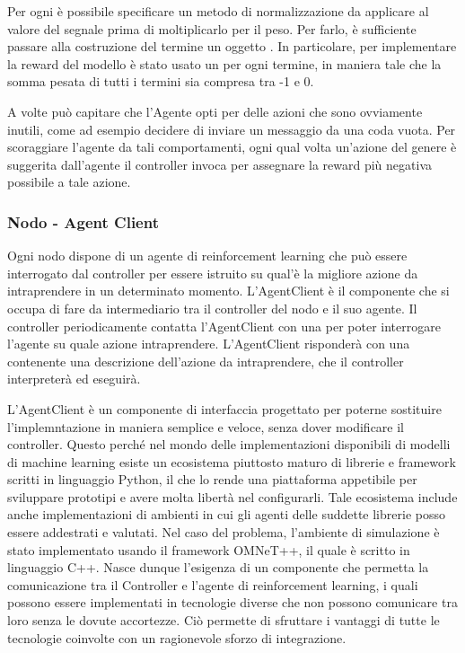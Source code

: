 \documentclass[conference]{IEEEtran}
\begin{document}
Per ogni  è possibile specificare un metodo di normalizzazione da
applicare al valore del segnale prima di moltiplicarlo per il peso. Per farlo, è
sufficiente passare alla costruzione del termine un oggetto . In
particolare, per implementare la reward del modello è stato usato un
 per ogni termine, in maniera tale che la somma pesata di tutti i termini sia compresa tra -1 e 0.

A volte può capitare che l'Agente opti per delle azioni che sono ovviamente inutili,
come ad esempio decidere di inviare un messaggio da una coda vuota. Per scoraggiare
l'agente da tali comportamenti, ogni qual volta un'azione del genere è suggerita
dall'agente il controller invoca  per assegnare
la reward più negativa possibile a tale azione. 

\subsubsection{Nodo - Agent Client}
Ogni nodo dispone di un agente di reinforcement learning che può essere interrogato
dal controller per essere istruito su qual'è la migliore azione da intraprendere in un
determinato momento. L'AgentClient è il componente che si occupa di fare da intermediario
tra il controller del nodo e il suo agente. Il controller periodicamente contatta
 l'AgentClient con una 
per poter interrogare l'agente
su quale azione intraprendere. L'AgentClient risponderà con una
 contenente una descrizione dell'azione da intraprendere,
che il controller interpreterà ed eseguirà.

L'AgentClient è un componente di interfaccia progettato per poterne sostituire 
l'implemntazione in maniera semplice e veloce, senza dover modificare il controller.
Questo perché nel mondo delle implementazioni disponibili di modelli di machine learning
 esiste un 
ecosistema piuttosto maturo di librerie e framework scritti in linguaggio Python, il
che lo rende una piattaforma appetibile per sviluppare prototipi e avere molta libertà
nel configurarli. Tale ecosistema include anche implementazioni di ambienti in cui
gli agenti delle suddette librerie posso essere addestrati e valutati. Nel caso del
problema, l'ambiente di simulazione è stato implementato usando il framework OMNeT++,
il quale è scritto in linguaggio C++. Nasce dunque l'esigenza di un componente che 
permetta la comunicazione tra il Controller e l'agente di reinforcement learning, i
quali possono essere implementati in tecnologie diverse che non possono comunicare
tra loro senza le dovute accortezze. Ciò permette di sfruttare i vantaggi di tutte le
tecnologie coinvolte con un ragionevole sforzo di integrazione.
\end{document}
